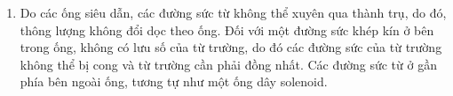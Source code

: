 \begin{loigiai}
\begin{enumerate}[1)]
    \item Do các ống siêu dẫn, các đường sức từ không thể xuyên qua thành trụ, do đó, thông lượng không đổi dọc theo ống. Đối với một đường sức khép kín ở bên trong ống, không có lưu số của từ trường, do đó các đường sức của từ trường không thể bị cong và từ trường cần phải đồng nhất. Các đường sức từ ở gần phía bên ngoài ống, tương tự như một ống dây solenoid.
    \begin{center}

\begin{tikzpicture}[x=0.75pt,y=0.75pt,yscale=-1,xscale=1]


\end{tikzpicture}
\end{center}
\end{enumerate}
\end{loigiai}
